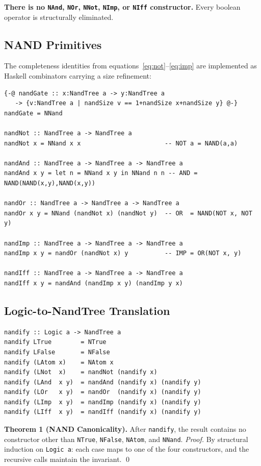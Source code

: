 \documentclass[sigconf,natbib=false]{acmart}
\begin{document}
\noindent\textbf{There is no \texttt{NAnd}, \texttt{NOr}, \texttt{NNot},
\texttt{NImp}, or \texttt{NIff} constructor.} Every boolean operator is
structurally eliminated.

\subsection{NAND Primitives}

The completeness identities from equations~\eqref{eq:not}--\eqref{eq:imp} are
implemented as Haskell combinators carrying a size refinement:

\begin{lstlisting}[style=haskell,caption={NAND boolean primitives}]
{-@ nandGate :: x:NandTree a -> y:NandTree a
   -> {v:NandTree a | nandSize v == 1+nandSize x+nandSize y} @-}
nandGate = NNand

nandNot :: NandTree a -> NandTree a
nandNot x = NNand x x                       -- NOT a = NAND(a,a)

nandAnd :: NandTree a -> NandTree a -> NandTree a
nandAnd x y = let n = NNand x y in NNand n n -- AND = NAND(NAND(x,y),NAND(x,y))

nandOr :: NandTree a -> NandTree a -> NandTree a
nandOr x y = NNand (nandNot x) (nandNot y)  -- OR  = NAND(NOT x, NOT y)

nandImp :: NandTree a -> NandTree a -> NandTree a
nandImp x y = nandOr (nandNot x) y          -- IMP = OR(NOT x, y)

nandIff :: NandTree a -> NandTree a -> NandTree a
nandIff x y = nandAnd (nandImp x y) (nandImp y x)
\end{lstlisting}

\subsection{Logic-to-NandTree Translation}

\begin{lstlisting}[style=haskell,caption={nandify: Logic a -> NandTree a}]
nandify :: Logic a -> NandTree a
nandify LTrue        = NTrue
nandify LFalse       = NFalse
nandify (LAtom x)    = NAtom x
nandify (LNot  x)    = nandNot (nandify x)
nandify (LAnd  x y)  = nandAnd (nandify x) (nandify y)
nandify (LOr   x y)  = nandOr  (nandify x) (nandify y)
nandify (LImp  x y)  = nandImp (nandify x) (nandify y)
nandify (LIff  x y)  = nandIff (nandify x) (nandify y)
\end{lstlisting}

\textbf{Theorem 1 (NAND Canonicality).} After \texttt{nandify}, the result
contains no constructor other than \texttt{NTrue}, \texttt{NFalse},
\texttt{NAtom}, and \texttt{NNand}. \textit{Proof.} By structural induction on
\texttt{Logic a}: each case maps to one of the four constructors, and the
recursive calls maintain the invariant. \qed
\end{document}
